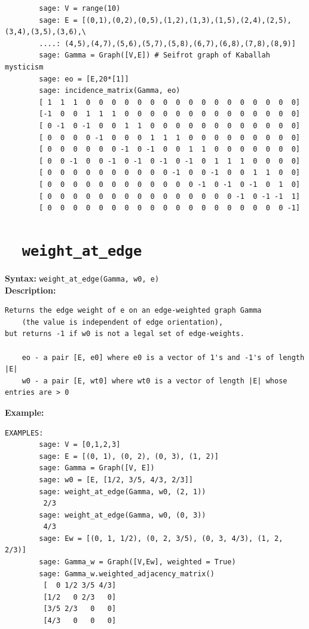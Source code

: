 \documentclass{article}
\begin{document}
\begin{verbatim}
        sage: V = range(10)
        sage: E = [(0,1),(0,2),(0,5),(1,2),(1,3),(1,5),(2,4),(2,5),(3,4),(3,5),(3,6),\
        ....: (4,5),(4,7),(5,6),(5,7),(5,8),(6,7),(6,8),(7,8),(8,9)]
        sage: Gamma = Graph([V,E]) # Seifrot graph of Kaballah mysticism
        sage: eo = [E,20*[1]]
        sage: incidence_matrix(Gamma, eo)
        [ 1  1  1  0  0  0  0  0  0  0  0  0  0  0  0  0  0  0  0  0]
        [-1  0  0  1  1  1  0  0  0  0  0  0  0  0  0  0  0  0  0  0]
        [ 0 -1  0 -1  0  0  1  1  0  0  0  0  0  0  0  0  0  0  0  0]
        [ 0  0  0  0 -1  0  0  0  1  1  1  0  0  0  0  0  0  0  0  0]
        [ 0  0  0  0  0  0 -1  0 -1  0  0  1  1  0  0  0  0  0  0  0]
        [ 0  0 -1  0  0 -1  0 -1  0 -1  0 -1  0  1  1  1  0  0  0  0]
        [ 0  0  0  0  0  0  0  0  0  0 -1  0  0 -1  0  0  1  1  0  0]
        [ 0  0  0  0  0  0  0  0  0  0  0  0 -1  0 -1  0 -1  0  1  0]
        [ 0  0  0  0  0  0  0  0  0  0  0  0  0  0  0 -1  0 -1 -1  1]
        [ 0  0  0  0  0  0  0  0  0  0  0  0  0  0  0  0  0  0  0 -1]
\end{verbatim}

\section{\tt \ \ weight\_at\_edge}

\textbf{Syntax:} \verb}weight_at_edge(Gamma, w0, e)}\\

\textbf{Description:}
\begin{verbatim}
Returns the edge weight of e on an edge-weighted graph Gamma
    (the value is independent of edge orientation),
but returns -1 if w0 is not a legal set of edge-weights.

    eo - a pair [E, e0] where e0 is a vector of 1's and -1's of length |E|
    w0 - a pair [E, wt0] where wt0 is a vector of length |E| whose entries are > 0
\end{verbatim}

\textbf{Example:}
\begin{verbatim}
EXAMPLES:
        sage: V = [0,1,2,3]
        sage: E = [(0, 1), (0, 2), (0, 3), (1, 2)]
        sage: Gamma = Graph([V, E])
        sage: w0 = [E, [1/2, 3/5, 4/3, 2/3]]
        sage: weight_at_edge(Gamma, w0, (2, 1))
         2/3
        sage: weight_at_edge(Gamma, w0, (0, 3))
         4/3
        sage: Ew = [(0, 1, 1/2), (0, 2, 3/5), (0, 3, 4/3), (1, 2, 2/3)]
        sage: Gamma_w = Graph([V,Ew], weighted = True)
        sage: Gamma_w.weighted_adjacency_matrix()
         [  0 1/2 3/5 4/3]
         [1/2   0 2/3   0]
         [3/5 2/3   0   0]
         [4/3   0   0   0]
\end{verbatim}
\end{document}
